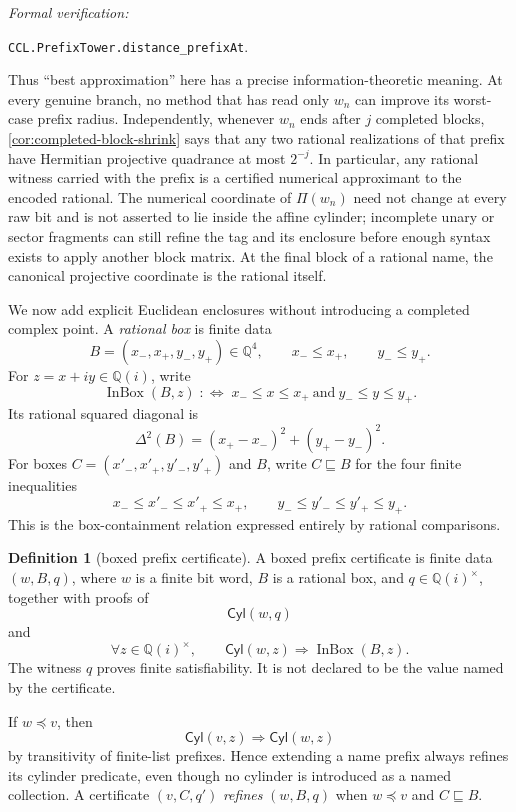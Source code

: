\documentclass[10pt]{article}
\theoremstyle{definition}
\newtheorem{definition}[theorem]{Definition}
\theoremstyle{remark}
\newcommand{\Q}{\mathbb{Q}}
\newcommand{\Qi}{\mathbb{Q}(i)}
\newcommand{\pref}{\preccurlyeq}
\newcommand{\Cyl}{\mathsf{Cyl}}
\newcommand{\leanref}[1]{\par\smallskip\noindent
  \emph{Formal verification:}\par\nobreak
  {\raggedright\nolinkurl{#1}.\par}}
\begin{document}
\leanref{CCL.PrefixTower.distance_prefixAt}

Thus ``best approximation'' here has a precise information-theoretic meaning.  At every genuine branch, no method that has read only $w_n$ can improve its worst-case prefix radius.  Independently, whenever $w_n$ ends after $j$ completed blocks, \autoref{cor:completed-block-shrink} says that any two rational realizations of that prefix have Hermitian projective quadrance at most $2^{-j}$.  In particular, any rational witness carried with the prefix is a certified numerical approximant to the encoded rational.  The numerical coordinate of $\Pi(w_n)$ need not change at every raw bit and is not asserted to lie inside the affine cylinder; incomplete unary or sector fragments can still refine the tag and its enclosure before enough syntax exists to apply another block matrix.  At the final block of a rational name, the canonical projective coordinate is the rational itself.

We now add explicit Euclidean enclosures without introducing a completed complex point.  A \emph{rational box} is finite data
\[
 B=(x_-,x_+,y_-,y_+)\in\Q^4,
 \qquad x_-\le x_+,
 \qquad y_-\le y_+.
\]
For $z=x+iy\in\Qi$, write
\[
 \operatorname{InBox}(B,z)
 \;:\Longleftrightarrow\;
 x_-\le x\le x_+
 \ \text{and}\ 
 y_-\le y\le y_+.
\]
Its rational squared diagonal is
\[
 \Delta^2(B)=(x_+-x_-)^2+(y_+-y_-)^2.
\]
For boxes $C=(x'_-,x'_+,y'_-,y'_+)$ and $B$, write $C\sqsubseteq B$ for the four finite inequalities
\[
 x_-\le x'_-\le x'_+\le x_+,
 \qquad
 y_-\le y'_-\le y'_+\le y_+.
\]
This is the box-containment relation expressed entirely by rational comparisons.

\begin{definition}[boxed prefix certificate]
A boxed prefix certificate is finite data $(w,B,q)$, where $w$ is a finite bit word, $B$ is a rational box, and $q\in\Qi^\times$, together with proofs of
\[
 \Cyl(w,q)
\]
and
\[
 \forall z\in\Qi^\times,
 \qquad
 \Cyl(w,z)\Longrightarrow \operatorname{InBox}(B,z).
\tag{7.20}
\]
The witness $q$ proves finite satisfiability.  It is not declared to be the value named by the certificate.
\end{definition}

If $w\pref v$, then
\[
 \Cyl(v,z)\Longrightarrow\Cyl(w,z)
\tag{7.21}
\]
by transitivity of finite-list prefixes.  Hence extending a name prefix always refines its cylinder predicate, even though no cylinder is introduced as a named collection.  A certificate $(v,C,q')$ \emph{refines} $(w,B,q)$ when $w\pref v$ and $C\sqsubseteq B$.
\end{document}
